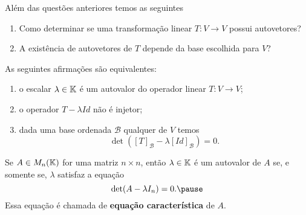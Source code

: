 \documentclass{beamer}
\begin{document}
    \begin{frame}
        Além das questões anteriores temos as seguintes\pause
        \vspace*{.5cm}
        \begin{enumerate}[label={\arabic*})]
            \item Como determinar se uma transformação linear $T \colon V \to V$ \pause possui autovetores?\pause

            \vspace*{2cm}

            \item A existência de autovetores de $T$ \pause depende da base escolhida para $V$?\pause
        \end{enumerate}
    \end{frame}

    \begin{frame}
        \begin{teorema}
            As seguintes afirmações são equivalentes:\pause
            \begin{enumerate}[label={\roman*})]
                \item o escalar $\lambda \in \mathbb{K}$ \pause é um autovalor do operador linear $T \colon V \to V$;\pause

                \vspace*{1cm}

                \item o operador $T - \lambda Id$ \pause não é injetor;\pause

                \vspace*{1cm}

                \item dada uma base ordenada $\mathcal{B}$ \pause qualquer de $V$ temos\pause
                \[
                    \det([T]_\mathcal{B} - \lambda[Id]_\mathcal{B}) = 0.
                \]
            \end{enumerate}
        \end{teorema}
    \end{frame}

    \begin{frame}
        \begin{teorema}
            Se $A \in M_n(\mathbb{K})$ \pause for uma matriz $n \times n$, \pause então $\lambda \in \mathbb{K}$ é um autovalor de $A$ \pause
            se, e somente se, $\lambda$ satisfaz a equação\pause
            \[
                \det(A - \lambda I_n) = 0.\pause
            \]
            Essa equação é chamada de \textbf{equação característica} de $A$.
        \end{teorema}
    \end{frame}
\end{document}
